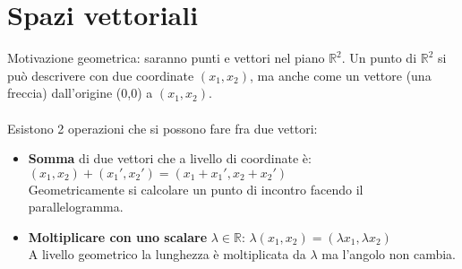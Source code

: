 \newpage
\section{Spazi vettoriali}
Motivazione geometrica: saranno punti e vettori nel piano $\mathbb{R}^2$. Un punto di $\mathbb{R}^2$ si può descrivere con due coordinate $(x_1,x_2)$, ma anche come un vettore (una freccia) dall'origine (0,0) a $(x_1, x_2)$.\\\\
Esistono 2 operazioni che si possono fare fra due vettori:
\begin{itemize}
    \item \textbf{Somma} di due vettori che a livello di coordinate è: $(x_1,x_2) + (x_1', x_2') = (x_1 + x_1', x_2 + x_2')$\\
    Geometricamente si calcolare un punto di incontro facendo il parallelogramma.
    \item \textbf{Moltiplicare con uno scalare} $\lambda \in \mathbb{R}$: $\lambda(x_1, x_2) = (\lambda x_1, \lambda x_2)$\\
    A livello geometrico la lunghezza è moltiplicata da $\lambda$ ma l'angolo non cambia.
\end{itemize}

